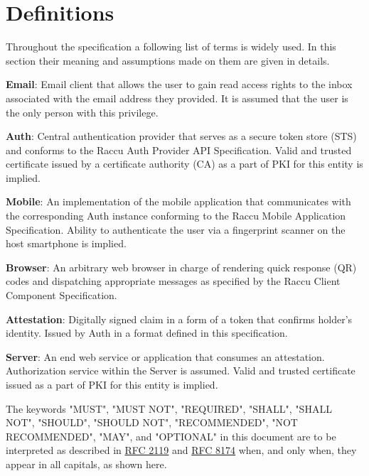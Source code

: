 \section{Definitions}
Throughout the specification a following list of terms is widely used. In this section their meaning and assumptions 
made on them are given in details.

\medskip
\textbf{Email}: Email client that allows the user to gain read access rights to the inbox associated
with the email address they provided. It is assumed that the user is the only person with this privilege.

\medskip
\textbf{Auth}: Central authentication provider that serves as a secure token store (STS) and conforms to 
the Raccu Auth Provider API Specification. Valid and trusted certificate issued by a certificate authority
(CA) as a part of PKI for this entity is implied.

\medskip
\textbf{Mobile}: An implementation of the mobile application that communicates with the corresponding Auth instance 
conforming to the Raccu Mobile Application Specification. Ability to authenticate the user via a fingerprint scanner
on the host smartphone is implied.

\medskip
\textbf{Browser}: An arbitrary web browser in charge of rendering quick response (QR) codes and dispatching appropriate 
messages as specified by the Raccu Client Component Specification.

\medskip
\textbf{Attestation}: Digitally signed claim in a form of a token that confirms holder's identity. Issued by 
Auth in a format defined in this specification.

\medskip
\textbf{Server}: An end web service or application that consumes an attestation. Authorization service within the 
Server is assumed. Valid and trusted certificate issued as a part of PKI for this entity is implied.

\medskip
The keywords "MUST", "MUST NOT", "REQUIRED", "SHALL", "SHALL NOT", "SHOULD", "SHOULD NOT", "RECOMMENDED", 
"NOT RECOMMENDED", "MAY", and "OPTIONAL" in this document are to be interpreted as described in 
\href{https://tools.ietf.org/html/rfc2119}{RFC 2119} and \href{https://tools.ietf.org/html/rfc8174}{RFC 8174} 
when, and only when, they appear in all capitals, as shown here.
